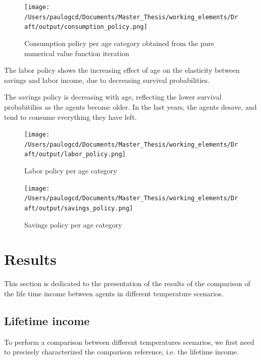 \documentclass{article}
\begin{document}
\begin{figure}[H]
    \centering
    \texttt{[image: /Users/paulogcd/Documents/Master\_Thesis/working\_elements/Draft/output/consumption\_policy.png]}
    \caption{Consumption policy per age category obtained from the pure numerical value function iteration}
    \label{fig:consumption_policy}
\end{figure}


The labor policy shows the increasing effect of age on
the elasticity between savings and labor income, due to
decreasing survival probabilities.

The savings policy is decreasing with age,
reflecting the lower survival probabitilies as the agents 
become older. 
In the last years, the agents desave, and tend to consume everything they have left. 


\begin{figure}[H]
    \centering
    \begin{minipage}[t]{0.45\textwidth}
        \centering
        \texttt{[image: /Users/paulogcd/Documents/Master\_Thesis/working\_elements/Draft/output/labor\_policy.png]}
        \caption{Labor policy per age category}
        \label{fig:labor_policy}
    \end{minipage}
    \hfill
    \begin{minipage}[t]{0.45\textwidth}
        \centering
        \texttt{[image: /Users/paulogcd/Documents/Master\_Thesis/working\_elements/Draft/output/savings\_policy.png]}
        \caption{Savings policy per age category}
        \label{fig:savings_policy}
    \end{minipage}
\end{figure}




\section{Results}

This section is dedicated to the presentation of the results of the comparison 
of the life time income between agents in different temperature scenarios. 

\subsection{Lifetime income}

To perform a comparison between different temperatures scenarios,
we first need to precisely characterized the comparison reference, 
i.e. the lifetime income.
\end{document}
